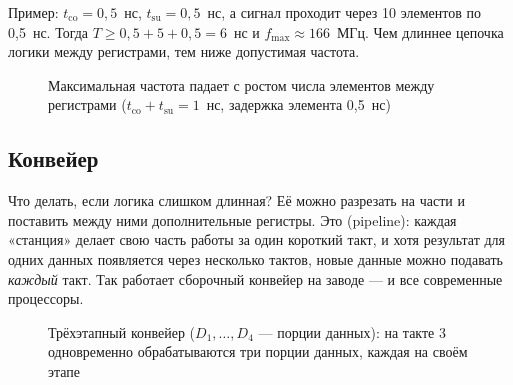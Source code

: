 Пример: $t_\text{co} = 0{,}5$~нс, $t_\text{su} = 0{,}5$~нс, а сигнал проходит
через 10 элементов по 0,5~нс. Тогда
$T \ge 0{,}5 + 5 + 0{,}5 = 6$~нс и $f_\text{max} \approx 166$~МГц. Чем
длиннее цепочка логики между регистрами, тем ниже допустимая частота.

\begin{figure}[H]
\centering
{}
\caption{Максимальная частота падает с ростом числа элементов между регистрами
($t_\text{co}+t_\text{su} = 1$~нс, задержка элемента 0,5~нс)}
\end{figure}

\subsection{Конвейер}

Что делать, если логика слишком длинная? Её можно разрезать на части и
поставить между ними дополнительные регистры. Это 
(pipeline): каждая «станция» делает свою часть работы за один короткий такт,
и хотя результат для одних данных появляется через несколько тактов, новые
данные можно подавать \emph{каждый} такт. Так работает сборочный конвейер на
заводе --- и все современные процессоры.

\begin{figure}[H]
\centering
{}
\caption{Трёхэтапный конвейер ($D_1,\dots,D_4$ --- порции данных): на такте 3 одновременно обрабатываются три
порции данных, каждая на своём этапе}
\end{figure}

